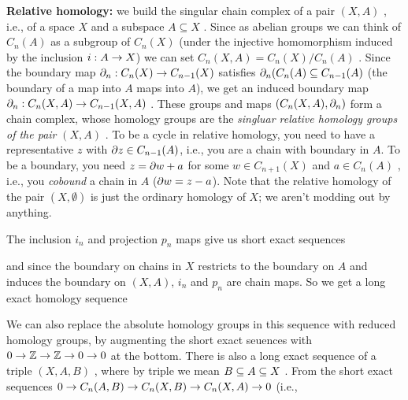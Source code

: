 {\bf Relative homology:} we build the singular chain complex
of a pair $(X,A)$ , i.e., of a space $X$ and a subspace $A\subseteq X$ .
Since as abelian groups we can think of 
$C_n(A)$ as a subgroup of $C_n(X)$ (under the injective homomorphism induced by the 
inclusion $i:A\rightarrow X$) we can set $C_n(X,A)= C_n(X)/C_n(A)$ . Since the
boundary map $\partial_n:C_n(X)\rightarrow C_{n-1}(X)$ satisfies
$\partial_n(C_n(A)\subseteq C_{n-1}(A)$ (the boundary of a map into $A$ maps into $A$),
we get an induced boundary map $\partial_n:C_n(X,A)\rightarrow C_{n-1}(X,A)$ . These
groups and maps $(C_n(X,A),\partial_n)$ form a chain complex, whose homology groups 
are the {\it singluar relative homology groups of the pair} $(X,A)$ . To be a cycle
in relative homology, you need to have a representative $z$ with $\partial z\in C_{n-1}(A)$,
i.e., you are a chain with boundary in $A$. To be a boundary, you need
$z=\partial w +a$ for some $w\in C_{n+1}(X)$ and $a\in C_n(A)$ , i.e., you {\it cobound}
a chain in $A$ ($\partial w = z-a$). Note that the relative homology of the pair $(X,\emptyset)$
is just the ordinary homology of $X$; we aren't modding out by anything.

\ssk



The inclusion $i_n$ and projection  $p_n$ maps give us short exact sequences 

\ssk


and since the boundary on chains
in $X$ restricts to the boundary on $A$ and induces the boundary on $(X,A)$,
$i_n$ and $p_n$ are chain maps. So we get a long exact homology sequence

\ssk


\ssk

We can also replace  the absolute homology groups in this
sequence with reduced homology groups, by augmenting the short exact seuences with
\hhsk $0\rightarrow {\Bbb Z} \rightarrow {\Bbb Z} \rightarrow 0 \rightarrow 0$ \hhsk at the bottom.
There is also a long exact sequence of a triple $(X,A,B)$ , where by triple we
mean $B\subseteq A\subseteq X$ . From the short exact sequences 
\hhsk $0\rightarrow C_n(A,B) \rightarrow C_n(X,B) \rightarrow C_n(X,A)\rightarrow 0$ \hhsk (i.e., 

